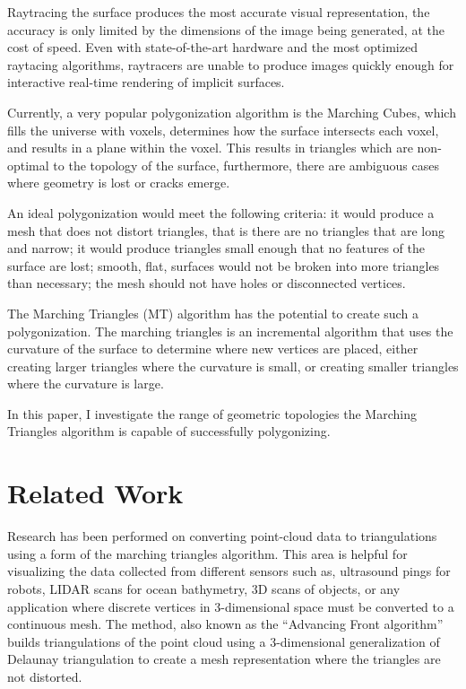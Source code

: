 \documentclass[conference]{acmsiggraph}
\begin{document}
Raytracing the surface produces the most accurate visual representation, the
accuracy is only limited by the dimensions of the image being generated, at the
cost of speed. Even with state-of-the-art hardware and the most optimized
raytacing algorithms, raytracers are unable to produce images quickly enough
for interactive real-time rendering of implicit surfaces.

Currently, a very popular polygonization algorithm is the Marching Cubes, which
fills the universe with voxels, determines how the surface intersects each
voxel, and results in a plane within the voxel. This results in triangles which
are non-optimal to the topology of the surface, furthermore, there are
ambiguous cases where geometry is lost or cracks emerge.

An ideal polygonization would meet the following criteria:
it would produce a mesh that does not distort triangles, that is there are no
triangles that are long and narrow; it would produce triangles small enough
that no features of the surface are lost; smooth, flat, surfaces would not be
broken into more triangles than necessary; the mesh should not have holes or
disconnected vertices.

The Marching Triangles (MT) algorithm has the potential to create such a
polygonization. The marching triangles is an incremental algorithm that uses
the curvature of the surface to determine where new vertices are placed, either
creating larger triangles where the curvature is small, or creating smaller
triangles where the curvature is large.

In this paper, I investigate the range of geometric topologies the Marching
Triangles algorithm is capable of successfully polygonizing.

\section{Related Work}

Research has been performed on converting point-cloud data to triangulations
using a form of the marching triangles algorithm\cite{Scheidegger2005}. This
area is helpful for visualizing the data collected from different sensors
such as, ultrasound pings for robots, LIDAR scans for ocean bathymetry, 3D
scans of objects, or any application where discrete vertices in 3-dimensional
space must be converted to a continuous mesh. The method, also known as the
``Advancing Front algorithm'' builds triangulations of the point cloud using a
3-dimensional generalization of Delaunay triangulation to create a mesh
representation where the triangles are not distorted.
\end{document}
